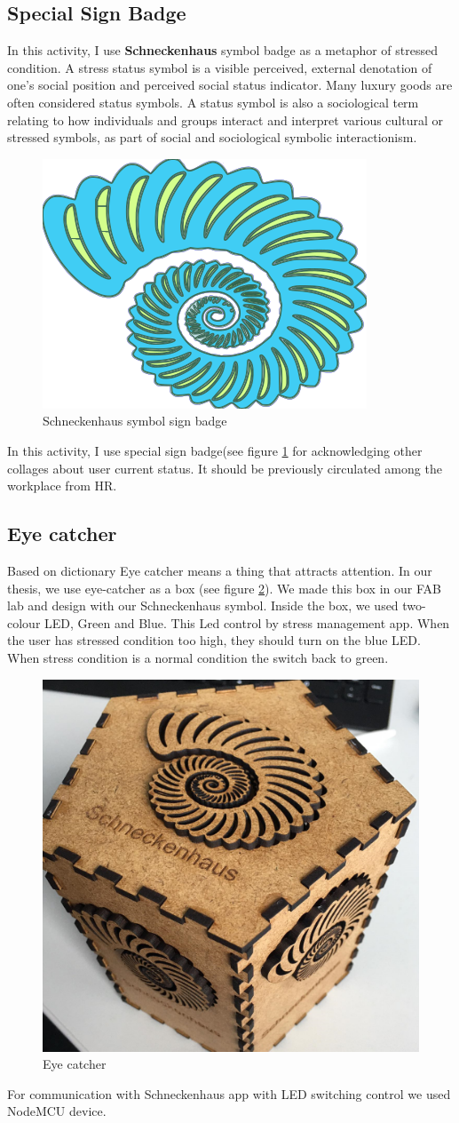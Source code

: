 \subsection{Special Sign Badge}
In this activity, I use \textbf{Schneckenhaus} symbol badge as a metaphor of stressed condition. A stress status symbol is a visible perceived, external denotation of one's social position and perceived social status indicator.\citep{Cherrington1994OrganizationalBehavior} Many luxury goods are often considered status symbols. A status symbol is also a sociological term relating to how individuals and groups interact and interpret various cultural or stressed symbols, as part of social and sociological symbolic interactionism.
\begin{figure}[hbt!] 
  \centering
  \includegraphics[width=0.4\linewidth]{chap4/image4/logo1.png}
  \caption[Schneckenhaus symbol sign badge ]{Schneckenhaus symbol sign badge}
  \label{fig:Sign_badge}
\end{figure}
In this activity, I use special sign badge(see figure \ref{fig:Sign_badge} for acknowledging other collages about user current status. It should be previously circulated among the workplace from \acs{HR}.
\subsection{Eye catcher}
Based on dictionary Eye catcher means a thing that attracts attention. In our thesis, we use eye-catcher as a box (see figure \ref{fig:eye}). We made this box in our FAB lab and design with our Schneckenhaus symbol. Inside the box, we used two-colour LED, Green and Blue. This Led control by stress management app.  When the user has stressed condition too high, they should turn on the blue LED. When stress condition is a normal condition the switch back to green. 
\begin{figure}[hbt!] 
  \centering
  \includegraphics[width=0.5\linewidth]{chap4/image4/skn2.png}
  \caption[Eye catcher ]{Eye catcher}
  \label{fig:eye}
\end{figure}
For communication with Schneckenhaus app with LED switching control we used NodeMCU device.

